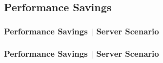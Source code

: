 \subsection{Performance Savings}
\begin{frame}[plain]%
\frametitle{Performance Savings | Server Scenario} 

% 
\end{frame}


\begin{frame}[plain]%
\frametitle{Performance Savings | Server Scenario} 
% 
\end{frame}


